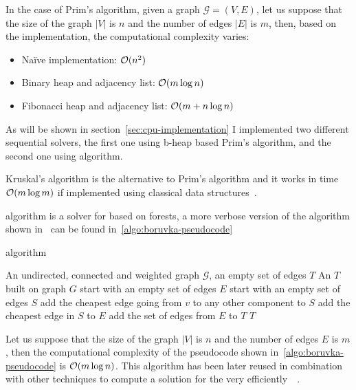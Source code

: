 \documentclass[a4paper,10pt]{article}
\begin{document}
In the case of Prim's algorithm, given a graph $\mathcal{G} = (V, E)$, let us suppose that the size of the graph $|V|$ is $n$ and the number of edges $|E|$ is $m$, then, based on the implementation, the computational complexity varies:
\begin{itemize}
	\item Na\"ive implementation: $\mathcal{O}(n^2)$
	\item Binary heap and adjacency list: $\mathcal{O}(m\log{n})$
	\item Fibonacci heap and adjacency list: $\mathcal{O}(m + n\log{n})$
\end{itemize}
As will be shown in section~\ref{sec:cpu-implementation} I implemented two different sequential
solvers, the first one using b-heap based Prim's algorithm, and the second one using \brkas algorithm.

Kruskal's algorithm is the alternative to Prim's algorithm and it works in time $\mathcal{O}(m\log{m})$ if
implemented using classical data structures~\cite{clrs}.

\brkas algorithm is a solver for \mstp based on forests, a more verbose version of the algorithm shown in~\cite{boruvka-pseudocode} can be found in~\ref{algo:boruvka-pseudocode}
\begin{algorithm}
	\caption{\brkas algorithm}
	\label{algo:boruvka-pseudocode}
	\begin{algorithmic}[1]
		\REQUIRE An undirected, connected and weighted graph $\mathcal{G}$, an empty set of edges $T$
		\ENSURE An \mst$T$ built on graph $G$
		\STATE start with an empty set of edges $E$
		\STATE start with an empty set of edges $S$
		\STATE add the cheapest edge going from $v$ to any other component to $S$
		\ENDFOR
		\STATE add the cheapest edge in $S$ to $E$
		\ENDFOR
		\STATE add the set of edges from $E$ to $T$
		\ENDWHILE
		\STATE\RETURN $T$
	\end{algorithmic}
\end{algorithm}

Let us suppose that the size of the graph $|V|$ is $n$ and the number of edges $E$ is $m$, then the computational complexity of the pseudocode shown in~\ref{algo:boruvka-pseudocode} is $\mathcal{O}(m\log{n})$. This algorithm has been later reused in combination with other techniques to compute a solution for the \mstp very efficiently~\cite{boruvka-ackermann}~\cite{karger-klein-tarjan}.
\end{document}
